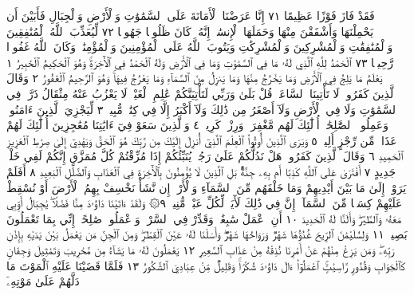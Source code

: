 فَقَدْ فَازَ فَوْزًا عَظِيمًا ٧١ إِنَّا عَرَضْنَا ٱلْأَمَانَةَ عَلَى ٱلسَّمَٰوَٰتِ
وَٱلْأَرْضِ وَٱلْجِبَالِ فَأَبَيْنَ أَن يَحْمِلْنَهَا وَأَشْفَقْنَ مِنْهَا وَحَمَلَهَا
ٱلْإِنسَٰنُۖ إِنَّهُۥ كَانَ ظَلُومࣰا جَهُولࣰا ٧٢ لِّيُعَذِّبَ ٱللَّهُ ٱلْمُنَٰفِقِينَ
وَٱلْمُنَٰفِقَٰتِ وَٱلْمُشْرِكِينَ وَٱلْمُشْرِكَٰتِ وَيَتُوبَ ٱللَّهُ
عَلَى ٱلْمُؤْمِنِينَ وَٱلْمُؤْمِنَٰتِۗ وَكَانَ ٱللَّهُ غَفُورࣰا رَّحِيمَۢا ٧٣
ٱلْحَمْدُ لِلَّهِ ٱلَّذِي لَهُۥ مَا فِي ٱلسَّمَٰوَٰتِ وَمَا فِي ٱلْأَرْضِ وَلَهُ ٱلْحَمْدُ
فِي ٱلْأٓخِرَةِۚ وَهُوَ ٱلْحَكِيمُ ٱلْخَبِيرُ ١ يَعْلَمُ مَا يَلِجُ فِي ٱلْأَرْضِ وَمَا
يَخْرُجُ مِنْهَا وَمَا يَنزِلُ مِنَ ٱلسَّمَآءِ وَمَا يَعْرُجُ فِيهَاۚ وَهُوَ
ٱلرَّحِيمُ ٱلْغَفُورُ ٢ وَقَالَ ٱلَّذِينَ كَفَرُوا۟ لَا تَأْتِينَا ٱلسَّاعَةُۖ
قُلْ بَلَىٰ وَرَبِّي لَتَأْتِيَنَّكُمْ عَٰلِمِ ٱلْغَيْبِۖ لَا يَعْزُبُ عَنْهُ مِثْقَالُ
ذَرَّةࣲ فِي ٱلسَّمَٰوَٰتِ وَلَا فِي ٱلْأَرْضِ وَلَآ أَصْغَرُ مِن ذَٰلِكَ
وَلَآ أَكْبَرُ إِلَّا فِي كِتَٰبࣲ مُّبِينࣲ ٣ لِّيَجْزِيَ ٱلَّذِينَ
ءَامَنُوا۟ وَعَمِلُوا۟ ٱلصَّٰلِحَٰتِۚ أُو۟لَٰٓئِكَ لَهُم مَّغْفِرَةࣱ وَرِزْقࣱ
كَرِيمࣱ ٤ وَٱلَّذِينَ سَعَوْ فِيٓ ءَايَٰتِنَا مُعَٰجِزِينَ أُو۟لَٰٓئِكَ
لَهُمْ عَذَابࣱ مِّن رِّجْزٍ أَلِيمࣱ ٥ وَيَرَى ٱلَّذِينَ أُوتُوا۟ ٱلْعِلْمَ
ٱلَّذِيٓ أُنزِلَ إِلَيْكَ مِن رَّبِّكَ هُوَ ٱلْحَقَّ وَيَهْدِيٓ إِلَىٰ صِرَٰطِ
ٱلْعَزِيزِ ٱلْحَمِيدِ ٦ وَقَالَ ٱلَّذِينَ كَفَرُوا۟ هَلْ نَدُلُّكُمْ عَلَىٰ رَجُلࣲ
يُنَبِّئُكُمْ إِذَا مُزِّقْتُمْ كُلَّ مُمَزَّقٍ إِنَّكُمْ لَفِي خَلْقࣲ جَدِيدٍ ٧
أَفْتَرَىٰ عَلَى ٱللَّهِ كَذِبًا أَم بِهِۦ جِنَّةُۢۗ بَلِ ٱلَّذِينَ لَا يُؤْمِنُونَ بِٱلْأٓخِرَةِ
فِي ٱلْعَذَابِ وَٱلضَّلَٰلِ ٱلْبَعِيدِ ٨ أَفَلَمْ يَرَوْا۟ إِلَىٰ مَا بَيْنَ أَيْدِيهِمْ
وَمَا خَلْفَهُم مِّنَ ٱلسَّمَآءِ وَٱلْأَرْضِۚ إِن نَّشَأْ نَخْسِفْ بِهِمُ ٱلْأَرْضَ
أَوْ نُسْقِطْ عَلَيْهِمْ كِسَفࣰا مِّنَ ٱلسَّمَآءِۚ إِنَّ فِي ذَٰلِكَ لَأٓيَةࣰ
لِّكُلِّ عَبْدࣲ مُّنِيبࣲ ٩۞ وَلَقَدْ ءَاتَيْنَا دَاوُۥدَ مِنَّا فَضْلࣰاۖ
يَٰجِبَالُ أَوِّبِي مَعَهُۥ وَٱلطَّيْرَۖ وَأَلَنَّا لَهُ ٱلْحَدِيدَ ١٠ أَنِ ٱعْمَلْ
سَٰبِغَٰتࣲ وَقَدِّرْ فِي ٱلسَّرْدِۖ وَٱعْمَلُوا۟ صَٰلِحًاۖ إِنِّي بِمَا تَعْمَلُونَ
بَصِيرࣱ ١١ وَلِسُلَيْمَٰنَ ٱلرِّيحَ غُدُوُّهَا شَهْرࣱ وَرَوَاحُهَا شَهْرࣱۖ
وَأَسَلْنَا لَهُۥ عَيْنَ ٱلْقِطْرِۖ وَمِنَ ٱلْجِنِّ مَن يَعْمَلُ بَيْنَ يَدَيْهِ بِإِذْنِ
رَبِّهِۦۖ وَمَن يَزِغْ مِنْهُمْ عَنْ أَمْرِنَا نُذِقْهُ مِنْ عَذَابِ ٱلسَّعِيرِ ١٢
يَعْمَلُونَ لَهُۥ مَا يَشَآءُ مِن مَّحَٰرِيبَ وَتَمَٰثِيلَ وَجِفَانࣲ كَٱلْجَوَابِ
وَقُدُورࣲ رَّاسِيَٰتٍۚ ٱعْمَلُوٓا۟ ءَالَ دَاوُۥدَ شُكْرࣰاۚ وَقَلِيلࣱ مِّنْ عِبَادِيَ
ٱلشَّكُورُ ١٣ فَلَمَّا قَضَيْنَا عَلَيْهِ ٱلْمَوْتَ مَا دَلَّهُمْ عَلَىٰ مَوْتِهِۦٓ
